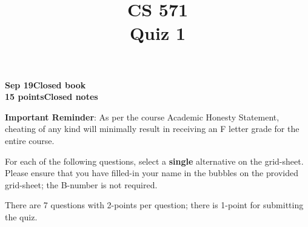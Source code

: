 \documentclass[12pt]{article}
\title{CS 571\\Quiz 1}
\date{}
\begin{document}
\maketitle

\begin{flushleft}
\textbf{Sep 19}\hfill\textbf{Closed book}\\
\textbf{15 points}\hfill\textbf{Closed notes}\\

\vspace{0.5cm}

\textbf{Important Reminder}: As per the course Academic Honesty
Statement, cheating of any kind will minimally result in receiving an
F letter grade for the entire course.


\end{flushleft}

For each of the following questions, select a \textbf{single}
alternative on the grid-sheet.  Please ensure that you have filled-in
your name in the bubbles on the provided grid-sheet; the B-number is
not required.

There are 7 questions with 2-points per question; there is 1-point
for submitting the quiz.
\end{document}

